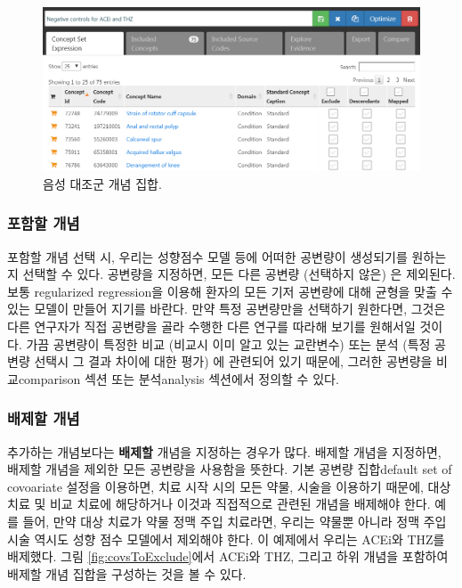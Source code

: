 \documentclass[10.5pt]{book}
\theoremstyle{definition}
\theoremstyle{definition}
\theoremstyle{definition}
\theoremstyle{remark}
\begin{document}
\begin{figure}

{\centering \includegraphics[width=1\linewidth]{images/PopulationLevelEstimation/ncConceptSet} 

}

\caption{음성 대조군 개념 집합.}\label{fig:ncConceptSet}
\end{figure}

\subsubsection*{포함할 개념}\label{-}

포함할 개념 선택 시, 우리는 성향점수 모델 등에 어떠한 공변량이
생성되기를 원하는지 선택할 수 있다. 공변량을 지정하면, 모든 다른 공변량
(선택하지 않은) 은 제외된다. 보통 regularized regression을 이용해 환자의
모든 기저 공변량에 대해 균형을 맞출 수 있는 모델이 만들어 지기를 바란다.
만약 특정 공변량만을 선택하기 원한다면, 그것은 다른 연구자가 직접
공변량을 골라 수행한 다른 연구를 따라해 보기를 원해서일 것이다. 가끔
공변량이 특정한 비교 (비교시 이미 알고 있는 교란변수) 또는 분석 (특정
공변량 선택시 그 결과 차이에 대한 평가) 에 관련되어 있기 때문에, 그러한
공변량을 비교comparison 섹션 또는 분석analysis 섹션에서 정의할 수 있다.

\subsubsection*{배제할 개념}\label{-}

추가하는 개념보다는 \textbf{배제할} 개념을 지정하는 경우가 많다. 배제할
개념을 지정하면, 배제할 개념을 제외한 모든 공변량을 사용함을 뜻한다.
기본 공변량 집합default set of covoariate 설정을 이용하면, 치료 시작
시의 모든 약물, 시술을 이용하기 때문에, 대상 치료 및 비교 치료에
해당하거나 이것과 직접적으로 관련된 개념을 배제해야 한다. 예를 들어,
만약 대상 치료가 약물 정맥 주입 치료라면, 우리는 약물뿐 아니라 정맥 주입
시술 역시도 성향 점수 모델에서 제외해야 한다. 이 예제에서 우리는 ACEi와
THZ를 배제했다. 그림 \ref{fig:covsToExclude}에서 ACEi와 THZ, 그리고 하위
개념을 포함하여 배제할 개념 집합을 구성하는 것을 볼 수 있다.
\end{document}
